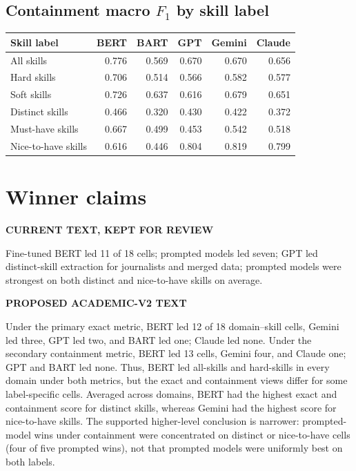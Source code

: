 \documentclass[11pt,a4paper]{article}
\newenvironment{OldBlock}
  {\definecolor{shadecolor}{RGB}{255,230,230}\begin{shaded}\begingroup\textbf{CURRENT TEXT, KEPT FOR REVIEW}\par\color{red!70!black}}
  {\endgroup\end{shaded}}
\newenvironment{NewBlock}
  {\definecolor{shadecolor}{RGB}{199,235,255}\begin{shaded}\begingroup\textbf{PROPOSED ACADEMIC-V2 TEXT}\par\color{newink}}
  {\endgroup\end{shaded}}
\begin{document}
\subsection*{Containment macro $F_1$ by skill label}
\begin{center}
\scriptsize
\begin{tabular}{lrrrrr}
\toprule
Skill label & BERT & BART & GPT & Gemini & Claude \\
\midrule
All skills & 0.776 & 0.569 & 0.670 & 0.670 & 0.656 \\
Hard skills & 0.706 & 0.514 & 0.566 & 0.582 & 0.577 \\
Soft skills & 0.726 & 0.637 & 0.616 & 0.679 & 0.651 \\
Distinct skills & 0.466 & 0.320 & 0.430 & 0.422 & 0.372 \\
Must-have skills & 0.667 & 0.499 & 0.453 & 0.542 & 0.518 \\
Nice-to-have skills & 0.616 & 0.446 & 0.804 & 0.819 & 0.799 \\
\bottomrule
\end{tabular}
\end{center}

\section{Winner claims}
\begin{OldBlock}
Fine-tuned BERT led 11 of 18 cells; prompted models led seven; GPT led
distinct-skill extraction for journalists and merged data; prompted models
were strongest on both distinct and nice-to-have skills on average.
\end{OldBlock}
\begin{NewBlock}
Under the primary exact metric, BERT led 12 of 18 domain--skill cells, Gemini
led three, GPT led two, and BART led one; Claude led none. Under the secondary
containment metric, BERT led 13 cells, Gemini four, and Claude one; GPT and BART
led none. Thus, BERT led all-skills and hard-skills in every domain under both
metrics, but the exact and containment views differ for some label-specific
cells. Averaged across domains, BERT had the highest exact and containment score
for distinct skills, whereas Gemini had the highest score for nice-to-have
skills. The supported higher-level conclusion is narrower: prompted-model wins
under containment were concentrated on distinct or nice-to-have cells (four of
five prompted wins), not that prompted models were uniformly best on both
labels.
\end{NewBlock}
\end{document}
